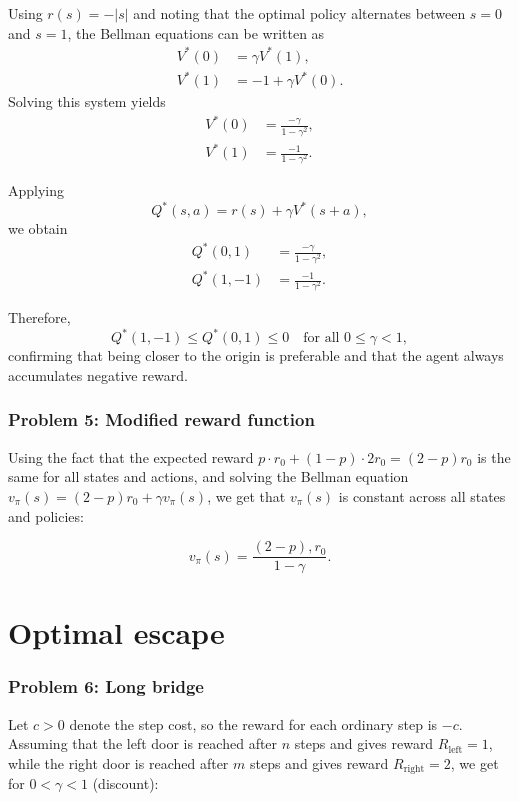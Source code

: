\documentclass[12pt,twoside]{article}
\begin{document}
		Using $r(s) = -|s|$ and noting that the optimal policy alternates between $s = 0$ and $s = 1$, the Bellman equations can be written as
        \begin{align*}
        V^*(0) &= \gamma V^*(1), \\
        V^*(1) &= -1 + \gamma V^*(0).
        \end{align*}
        Solving this system yields
        \begin{align*}
        V^*(0) &= \frac{-\gamma}{1 - \gamma^2}, \\
        V^*(1) &= \frac{-1}{1 - \gamma^2}.
        \end{align*}

        Applying
        \[
        Q^*(s,a) = r(s) + \gamma V^*(s + a),
        \]
        we obtain
        \begin{align*}
        Q^*(0,1) &= \frac{-\gamma}{1 - \gamma^2}, \tag{1} \\
        Q^*(1,-1) &= \frac{-1}{1 - \gamma^2}. \tag{2}
        \end{align*}

        Therefore,
        \[
        Q^*(1,-1) \leq Q^*(0,1) \leq 0 \quad \text{for all } 0 \leq \gamma < 1,
        \]
        confirming that being closer to the origin is preferable and that the agent always accumulates negative reward.


\subsubsection*{{\color{red}Problem 5:  Modified reward function}}

Using the fact that the expected reward $p \cdot r_0 + (1-p) \cdot 2r_0 = (2-p)r_0$ is the same for all states and actions, and solving the Bellman equation
  $v_\pi(s) = (2-p)r_0 + \gamma v_\pi(s)$, we get that $v_\pi(s)$ is constant across all states and policies:

  $$v_\pi(s) = \frac{(2-p),r_0}{1-\gamma}.$$


\section{Optimal escape}
\subsubsection*{{\color{red}Problem 6:  Long bridge}}
Let $c>0$ denote the step cost, so the reward for each ordinary step is $-c$. Assuming that the left door is reached
after $n$ steps and gives reward $R_{\text{left}}=1$, while the right door is reached after $m$ steps and gives reward
$R_{\text{right}}=2$, we get for $0<\gamma<1$ (discount):
\end{document}
